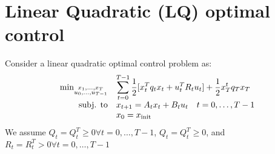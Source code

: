 \documentclass{book}
\theoremstyle{definition}
\theoremstyle{remark}
\theoremstyle{remark}
\begin{document}
\chapter{Linear Quadratic (LQ) optimal control}

Consider a linear quadratic optimal control problem as: 
\[
    \begin{array}{r l}
        \min_{\substack{x_1,\dots,x_T \\ u_0,\dots,u_{T-1}}} & \displaystyle\sum_{t=0}^{T-1}\displaystyle\frac{1}{2}[x_t^Tq_tx_t+u_t^TR_tu_t] + \displaystyle\frac{1}{2}x_T^tq_Tx_T\\
        \text{subj. to} & x_{t+1} = A_tx_t + B_tu_t \quad t=0,\dots,T-1\\
                        &x_0 = x_{\text{init}}
    \end{array}
\]
We assume $Q_t=Q_t^T\geq 0 \forall t=0,\dots,T-1$, $Q_t = Q_t^T \geq 0$, and $R_t=R_t^T > 0 \forall t=0,\dots,T-1$
\end{document}
